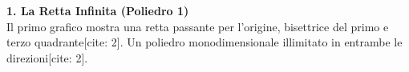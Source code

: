 \documentclass[12pt, a4paper]{article}
\begin{document}
	\vspace{0.6cm}
	\textbf{1. La Retta Infinita (Poliedro 1)}\\
	Il primo grafico mostra una retta passante per l'origine, bisettrice del primo e terzo quadrante[cite: 2]. Un poliedro monodimensionale illimitato in entrambe le direzioni[cite: 2].
	
	\begin{figure}[H]
		\centering
	\end{figure}
	
\end{document}
